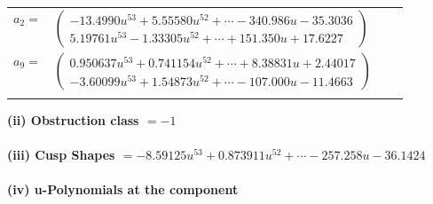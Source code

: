 \documentclass[1p]{elsarticle_modified}
\theoremstyle{definition}
\begin{document}
\begin{tabular}{m{7pt} m{180pt} m{7pt} m{180pt} }
\flushright $a_{2}=$&$\begin{pmatrix}-13.4990 u^{53}+5.55580 u^{52}+\cdots-340.986 u-35.3036\\5.19761 u^{53}-1.33305 u^{52}+\cdots+151.350 u+17.6227\end{pmatrix}$ \\
\flushright $a_{9}=$&$\begin{pmatrix}0.950637 u^{53}+0.741154 u^{52}+\cdots+8.38831 u+2.44017\\-3.60099 u^{53}+1.54873 u^{52}+\cdots-107.000 u-11.4663\end{pmatrix}$\\&\end{tabular}
\flushleft \textbf{(ii) Obstruction class $= -1$}\\~\\
\flushleft \textbf{(iii) Cusp Shapes $= -8.59125 u^{53}+0.873911 u^{52}+\cdots-257.258 u-36.1424$}\\~\\
\newpage\renewcommand{\arraystretch}{1}
\flushleft \textbf{(iv) u-Polynomials at the component}\newline \\
\end{document}
